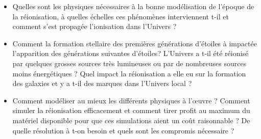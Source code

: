 %
%
%

\begin{itemize}
\item Quelles sont les physiques nécessaires à la bonne modélisation de l'époque de la réionisation, à quelles échelles ces phénomènes interviennent t-il et comment s'est propagée l'ionisation dans l'Univers ?
\item Comment la formation stellaire des premières générations d'étoiles à impactée l'apparition des générations suivantes d'étoiles? 
L'Univers a t-il été réionisé par quelques grosses sources très lumineuses ou par de nombreuses sources moins énergétiques ?
Quel impact la réionisation a elle eu sur la formation des galaxies et y a t-il des marques dans l'Univers local ?
\item Comment modéliser au mieux les différents physiques à l’œuvre ?
Comment simuler la réionisation efficacement et comment tirer profit au maximum du matériel disponible pour que ces simulations aient un coût raisonnable ?
De quelle résolution à t-on besoin et quels sont les compromis nécessaire ?
\end{itemize}



